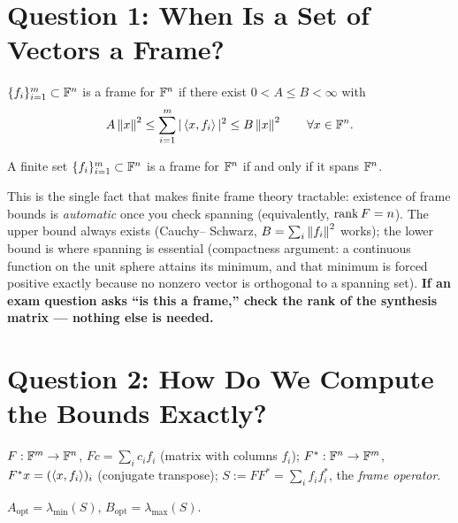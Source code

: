 \section{Question 1: When Is a Set of Vectors a Frame?}
\label{sec:review-q1}

\begin{definition}
\label{rev:def-frame}
$\{f_i\}_{i=1}^m\subset\mathbb{F}^n$ is a frame for $\mathbb{F}^n$ if there exist
$0<A\le B<\infty$ with
\[
  A\left\| x \right\|^2 \le \sum_{i=1}^m|\left\langle x, f_i \right\rangle|^2 \le B\left\| x \right\|^2
  \qquad\forall x\in\mathbb{F}^n.
\]
\end{definition}

\begin{theorem}
\label{rev:thm-spanning}
A finite set $\{f_i\}_{i=1}^m\subset\mathbb{F}^n$ is a frame for $\mathbb{F}^n$ if and
only if it spans $\mathbb{F}^n$.
\end{theorem}

\begin{reviewbox}
This is the single fact that makes finite frame theory tractable:
existence of frame bounds is \emph{automatic} once you check spanning
(equivalently, $\operatorname{rank} F = n$). The upper bound always exists (Cauchy--
Schwarz, $B=\sum_i\left\| f_i \right\|^2$ works); the lower bound is where
spanning is essential (compactness argument: a continuous function on
the unit sphere attains its minimum, and that minimum is forced
positive exactly because no nonzero vector is orthogonal to a spanning
set). \textbf{If an exam question asks ``is this a frame,'' check the
rank of the synthesis matrix --- nothing else is needed.}
\end{reviewbox}

\section{Question 2: How Do We Compute the Bounds Exactly?}
\label{sec:review-q2}

\begin{definition}
\label{rev:def-operators}
$F:\mathbb{F}^m\to\mathbb{F}^n$, $Fc=\sum_ic_if_i$ (matrix with columns $f_i$);
$F^*:\mathbb{F}^n\to\mathbb{F}^m$, $F^*x=(\left\langle x, f_i \right\rangle)_i$ (conjugate transpose);
$S:=FF^*=\sum_if_if_i^*$, the \emph{frame operator}.
\end{definition}

\begin{theorem}
\label{rev:thm-eigenvalues}
$A_{\mathrm{opt}}=\lambda_{\min}(S)$, $B_{\mathrm{opt}}=\lambda_{\max}(S)$.
\end{theorem}

